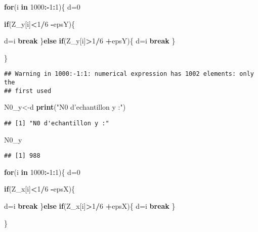 \documentclass[]{article}
\newenvironment{Shaded}{\begin{snugshade}}{\end{snugshade}}
\newcommand{\KeywordTok}[1]{\textcolor[rgb]{0.13,0.29,0.53}{\textbf{#1}}}
\newcommand{\DecValTok}[1]{\textcolor[rgb]{0.00,0.00,0.81}{#1}}
\newcommand{\StringTok}[1]{\textcolor[rgb]{0.31,0.60,0.02}{#1}}
\newcommand{\ControlFlowTok}[1]{\textcolor[rgb]{0.13,0.29,0.53}{\textbf{#1}}}
\newcommand{\OperatorTok}[1]{\textcolor[rgb]{0.81,0.36,0.00}{\textbf{#1}}}
\newcommand{\NormalTok}[1]{#1}
\begin{document}
\begin{Shaded}
\begin{Highlighting}[]
\ControlFlowTok{for}\NormalTok{(i }\ControlFlowTok{in} \DecValTok{1000}\OperatorTok{:-}\DecValTok{1}\OperatorTok{:}\DecValTok{1}\NormalTok{)\{}
\NormalTok{  d=}\DecValTok{0}
 
  \ControlFlowTok{if}\NormalTok{(Z_y[i]}\OperatorTok{<}\DecValTok{1}\OperatorTok{/}\DecValTok{6} \OperatorTok{-}\NormalTok{epsY)\{}
   
\NormalTok{    d=i}
    \ControlFlowTok{break}
\NormalTok{  \}}\ControlFlowTok{else} \ControlFlowTok{if}\NormalTok{(Z_y[i]}\OperatorTok{>}\DecValTok{1}\OperatorTok{/}\DecValTok{6} \OperatorTok{+}\NormalTok{epsY)\{}
\NormalTok{    d=i}
    \ControlFlowTok{break}
\NormalTok{  \}}
  
\NormalTok{\}}
\end{Highlighting}
\end{Shaded}

\begin{verbatim}
## Warning in 1000:-1:1: numerical expression has 1002 elements: only the
## first used
\end{verbatim}

\begin{Shaded}
\begin{Highlighting}[]
\NormalTok{N0_y<-d}
\KeywordTok{print}\NormalTok{(}\StringTok{"N0 d'echantillon y :"}\NormalTok{)}
\end{Highlighting}
\end{Shaded}

\begin{verbatim}
## [1] "N0 d'echantillon y :"
\end{verbatim}

\begin{Shaded}
\begin{Highlighting}[]
\NormalTok{N0_y}
\end{Highlighting}
\end{Shaded}

\begin{verbatim}
## [1] 988
\end{verbatim}

\begin{Shaded}
\begin{Highlighting}[]
\ControlFlowTok{for}\NormalTok{(i }\ControlFlowTok{in} \DecValTok{1000}\OperatorTok{:-}\DecValTok{1}\OperatorTok{:}\DecValTok{1}\NormalTok{)\{}
\NormalTok{  d=}\DecValTok{0}
 
  \ControlFlowTok{if}\NormalTok{(Z_x[i]}\OperatorTok{<}\DecValTok{1}\OperatorTok{/}\DecValTok{6} \OperatorTok{-}\NormalTok{epsX)\{}
   
\NormalTok{    d=i}
    \ControlFlowTok{break}
\NormalTok{  \}}\ControlFlowTok{else} \ControlFlowTok{if}\NormalTok{(Z_x[i]}\OperatorTok{>}\DecValTok{1}\OperatorTok{/}\DecValTok{6} \OperatorTok{+}\NormalTok{epsX)\{}
\NormalTok{    d=i}
    \ControlFlowTok{break}
\NormalTok{  \}}
  
\NormalTok{\}}
\end{Highlighting}
\end{Shaded}
\end{document}

